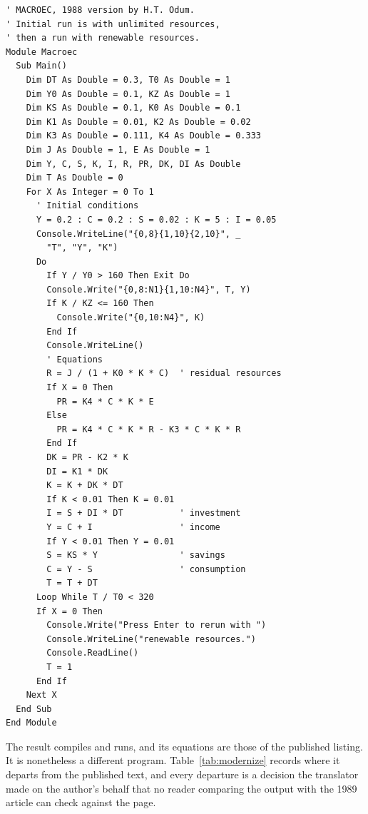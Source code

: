 \documentclass[3p,times,authoryear,twocolumn]{elsarticle}
\begin{document}
\begin{lstlisting}[basicstyle=\ttfamily\scriptsize,keepspaces=true,caption={Listing~\ref{lst:macroec} ``modernized'' into a Visual Basic .NET module. Everything the recipe does not cover---the graphics, the \texttt{GOTO} structure, the \texttt{CONT} restart---had to be decided by the translator.},label={lst:macroec:vb}]
' MACROEC, 1988 version by H.T. Odum.
' Initial run is with unlimited resources,
' then a run with renewable resources.
Module Macroec
  Sub Main()
    Dim DT As Double = 0.3, T0 As Double = 1
    Dim Y0 As Double = 0.1, KZ As Double = 1
    Dim KS As Double = 0.1, K0 As Double = 0.1
    Dim K1 As Double = 0.01, K2 As Double = 0.02
    Dim K3 As Double = 0.111, K4 As Double = 0.333
    Dim J As Double = 1, E As Double = 1
    Dim Y, C, S, K, I, R, PR, DK, DI As Double
    Dim T As Double = 0
    For X As Integer = 0 To 1
      ' Initial conditions
      Y = 0.2 : C = 0.2 : S = 0.02 : K = 5 : I = 0.05
      Console.WriteLine("{0,8}{1,10}{2,10}", _
        "T", "Y", "K")
      Do
        If Y / Y0 > 160 Then Exit Do
        Console.Write("{0,8:N1}{1,10:N4}", T, Y)
        If K / KZ <= 160 Then
          Console.Write("{0,10:N4}", K)
        End If
        Console.WriteLine()
        ' Equations
        R = J / (1 + K0 * K * C)  ' residual resources
        If X = 0 Then
          PR = K4 * C * K * E
        Else
          PR = K4 * C * K * R - K3 * C * K * R
        End If
        DK = PR - K2 * K
        DI = K1 * DK
        K = K + DK * DT
        If K < 0.01 Then K = 0.01
        I = S + DI * DT           ' investment
        Y = C + I                 ' income
        If Y < 0.01 Then Y = 0.01
        S = KS * Y                ' savings
        C = Y - S                 ' consumption
        T = T + DT
      Loop While T / T0 < 320
      If X = 0 Then
        Console.Write("Press Enter to rerun with ")
        Console.WriteLine("renewable resources.")
        Console.ReadLine()
        T = 1
      End If
    Next X
  End Sub
End Module
\end{lstlisting}

The result compiles and runs, and its equations are those of the published listing. It is nonetheless a different program. Table~\ref{tab:modernize} records where it departs from the published text, and every departure is a decision the translator made on the author's behalf that no reader comparing the output with the 1989 article can check against the page.
\end{document}
